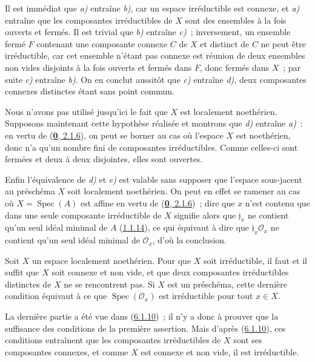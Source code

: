 Il est immédiat que \emph{a)} entraîne \emph{b)}, car un espace irréductible est connexe, et
\emph{a)} entraîne que les composantes irréductibles de $X$ sont des ensembles à la
fois ouverts et fermés. Il est trivial que \emph{b)} entraîne \emph{c)}~; inversement, un
ensemble fermé $F$ contenant
une composante connexe $C$ de $X$ et distinct de $C$ ne peut être
irréductible, car cet ensemble n'étant pas connexe est réunion de deux
ensembles non vides disjoints à la fois ouverts et fermés dans $F$, donc
fermés dans $X$~; par suite \emph{c)} entraîne \emph{b)}. On en conclut aussitôt que \emph{c)}
entraîne \emph{d)}, deux composantes connexes distinctes étant sans point commun.

Nous n'avons pas utilisé jusqu'ici le fait que $X$ est localement noethérien.
Supposons maintenant cette hypothèse réalisée et montrons que \emph{d)} entraîne
\emph{a)}~: en vertu de (\hyperref[0.2.1.6-fr]{\textbf{0}, 2.1.6}), on peut se borner au cas
où l'espace $X$ est noethérien, donc n'a qu'un nombre fini de composantes
irréductibles. Comme celles-ci sont fermées et deux à deux disjointes, elles
sont ouvertes.

Enfin l'équivalence de \emph{d)} et \emph{e)} est valable sans supposer que l'espace
sous-jacent au préschéma $X$ soit localement noethérien. On peut en effet se
ramener au cas où $X=\operatorname{Spec}(A)$ est affine en vertu de
(\hyperref[0.2.1.6-fr]{\textbf{0}, 2.1.6})~; dire que $x$ n'est contenu que dans une
seule composante irréductible de $X$ signifie alors que $\mathfrak{j}_x$ ne
contient qu'un seul idéal minimal de $A$ (\hyperref[I.1.1.14-fr]{1.1.14}), ce
qui équivaut à dire que $\mathfrak{j}_x\mathscr{O}_x$ ne contient qu'un seul
idéal minimal de $\mathscr{O}_x$, d'où la conclusion.

\begin{corollary}[6.1.11]
\label{I.6.1.11-fr}
Soit $X$ un espace localement noethérien. Pour que $X$ soit irréductible, il
faut et il suffit que $X$ soit connexe et non vide, et que deux composantes
irréductibles distinctes de $X$ ne se rencontrent pas. Si $X$ est un
préschéma, cette dernière condition équivaut à ce que
$\operatorname{Spec}(\mathscr{O}_x)$ est irréductible pour tout $x\in X$.
\end{corollary}

La dernière partie a été vue dans (\hyperref[I.6.1.10-fr]{6.1.10})~; il n'y a
donc à prouver que la suffisance des conditions de la première assertion.
Mais d'après (\hyperref[I.6.1.10-fr]{6.1.10}), ces conditions entraînent que
les composantes irréductibles de $X$ sont ses composantes connexes, et comme
$X$ est connexe et non vide, il est irréductible.

